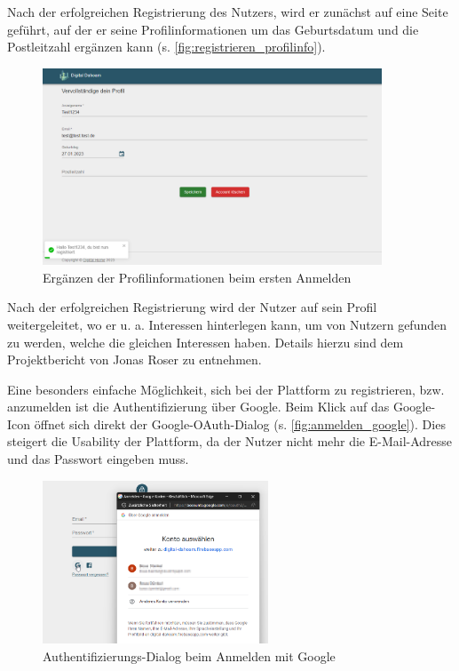 Nach der erfolgreichen Registrierung des Nutzers, wird er zunächst auf eine Seite geführt, auf der er seine Profilinformationen um das Geburtsdatum und die Postleitzahl ergänzen kann (s. \autoref{fig:registrieren_profilinfo}).

\begin{figure}[!htb]
  \centering
  \includegraphics[width=0.9\textwidth]{figures/boas/21_registrieren_profilinfo.png}
  \caption[]{Ergänzen der Profilinformationen beim ersten Anmelden}
  \label{fig:registrieren_profilinfo}
\end{figure}

Nach der erfolgreichen Registrierung wird der Nutzer auf sein Profil weitergeleitet, wo er u. a. Interessen hinterlegen kann, um von Nutzern gefunden zu werden, welche die gleichen Interessen haben. Details hierzu sind dem Projektbericht von Jonas Roser zu entnehmen.

Eine besonders einfache Möglichkeit, sich bei der Plattform zu registrieren, bzw. anzumelden ist die Authentifizierung über Google. Beim Klick auf das Google-Icon öffnet sich direkt der Google-OAuth-Dialog (s. \autoref{fig:anmelden_google}). Dies steigert die Usability der Plattform, da der Nutzer nicht mehr die E-Mail-Adresse und das Passwort eingeben muss.

\begin{figure}[!htb]
  \centering
  \includegraphics[width=0.6\textwidth]{figures/boas/21_anmelden_google.png}
  \caption[]{Authentifizierungs-Dialog beim Anmelden mit Google}
  \label{fig:anmelden_google}
\end{figure}

